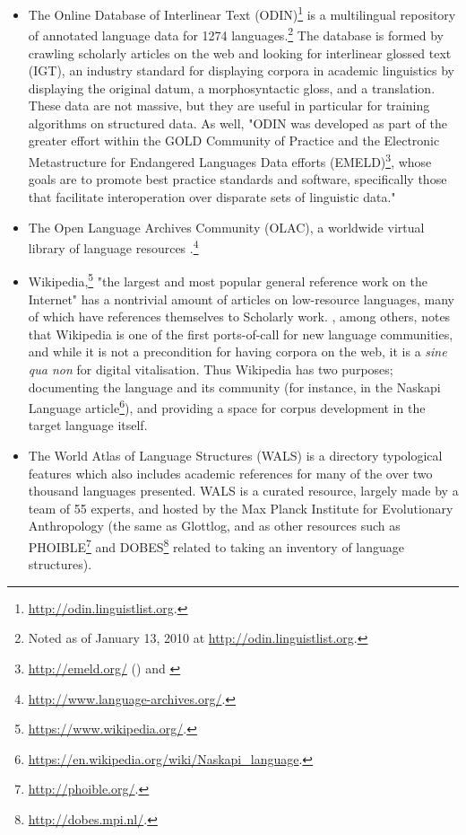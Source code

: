 \begin{itemize}
\item The Online Database of Interlinear Text (ODIN)\footnote{\href{http://odin.linguistlist.org}{http://odin.linguistlist.org}. } is a multilingual repository of annotated language data for 1274 languages.\footnote{Noted as of January 13, 2010 at \href{http://odin.linguistlist.org}{http://odin.linguistlist.org}. } The database is formed by crawling scholarly articles on the web and looking for interlinear glossed text (IGT), an industry standard for displaying corpora in academic linguistics by displaying the original datum, a morphosyntactic gloss, and a translation. These data are not massive, but they are useful in particular for training algorithms on structured data. As well, "ODIN was developed as part of the greater effort within the GOLD Community of Practice \citep{farrar2007gold} and the Electronic Metastructure for Endangered Languages Data efforts (EMELD)\footnote{\href{http://emeld.org/}{http://emeld.org/} () and \citet{farrar2002common}}, whose goals are to promote best practice standards and software, specifically those that facilitate interoperation over disparate sets of linguistic data." \citep{lewis2010developing}

\item The Open Language Archives Community (OLAC), a worldwide virtual library of language resources \citep{simons2003open}.\footnote{\href{http://www.language-archives.org/}{http://www.language-archives.org/}. }

\item Wikipedia,\footnote{\href{https://www.wikipedia.org/}{https://www.wikipedia.org/}. } "the largest and most popular general reference work on the Internet" \citep{wiki:Wikipedia} has a nontrivial amount of articles on low-resource languages, many of which have references themselves to Scholarly work. \citet{kornai2013digital}, among others, notes that Wiki\-pedia is one of the first ports-of-call for new language communities, and while it is not a precondition for having corpora on the web, it is a {\it sine qua non} for digital vitalisation. Thus Wikipedia has two purposes; documenting the language and its community (for instance, in the Naskapi Language article\footnote{\href{https://en.wikipedia.org/wiki/Naskapi\_language}{https://en.wikipedia.org/wiki/Naskapi\_language}. }), and providing a space for corpus development in the target language itself.

\item The World Atlas of Language Structures (WALS) is a directory typological features which also includes academic references for many of the over two thousand languages presented. WALS is a curated resource, largely made by a team of 55 experts, and hosted by the Max Planck Institute for Evolutionary Anthropology (the same as Glottlog, and as other resources such as PHOIBLE\footnote{\href{http://phoible.org/}{http://phoible.org/}. } \citep{phoible} and DOBES\footnote{\href{http://dobes.mpi.nl/}{http://dobes.mpi.nl/}. } \citep{wittenburg2003dobes} related to taking an inventory of language structures). \citep{wals}


\end{itemize}
